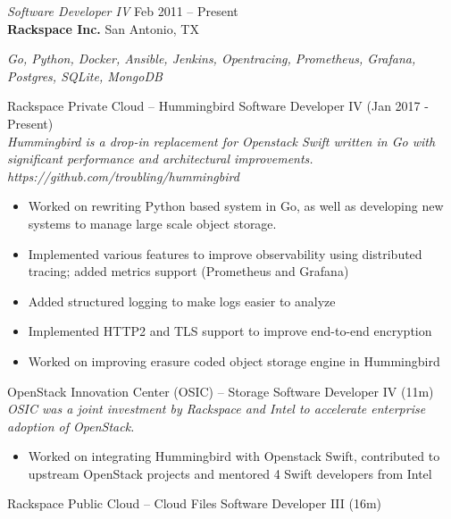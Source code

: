 \documentclass[margin,line]{resume}
\begin{document}
\begin{resume}
{\sl Software Developer IV } \hfill
     Feb 2011 -- Present\\
     \textbf{Rackspace Inc.} \hfill
     San Antonio, TX\\[4pt]
{\small\centering\textit{Go, Python, Docker, Ansible, Jenkins, Opentracing, Prometheus, Grafana, Postgres, SQLite, MongoDB}\par}\vspace*{-\baselineskip}
\vspace{4pt}
{\small Rackspace Private Cloud -- Hummingbird  \hfill  Software Developer IV (Jan 2017 - Present)}\\
{\small\textit{Hummingbird is a drop-in replacement for Openstack
Swift written in Go with significant performance and architectural improvements. https://github.com/troubling/hummingbird}}
\begin{itemize} \itemsep -2pt %
\small\item Worked on rewriting Python based system in Go, as well as developing new systems to manage large scale object storage.
\small\item Implemented various features to improve observability using distributed tracing; added metrics support (Prometheus and Grafana)
\small\item Added structured logging to make logs easier to analyze
\small\item Implemented HTTP2 and TLS support to improve end-to-end encryption
\small\item Worked on improving erasure coded object storage engine in Hummingbird
\end{itemize}\vspace*{-\baselineskip} %
\vspace{4pt}
{\small OpenStack Innovation Center (OSIC) -- Storage  \hfill  Software Developer IV (11m)}\\
{\small\textit{OSIC was a joint investment by Rackspace and Intel to accelerate enterprise adoption of OpenStack.}}
\begin{itemize} \itemsep -2pt %
\small\item Worked on integrating Hummingbird with Openstack Swift, contributed to upstream OpenStack projects and mentored 4 Swift developers from Intel
\end{itemize}\vspace*{-\baselineskip} %
\vspace{4pt}
{\small Rackspace Public Cloud -- Cloud Files  \hfill  Software Developer III (16m)}\\

\end{resume}
\end{document}
